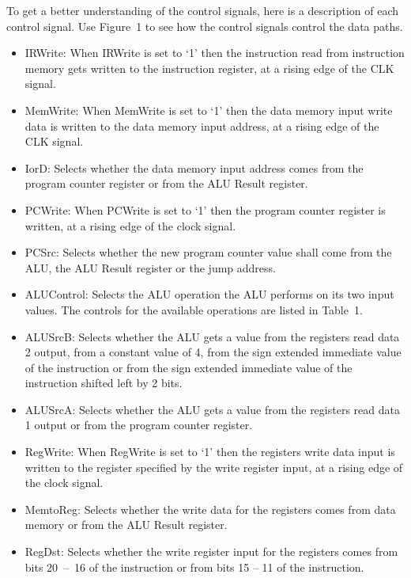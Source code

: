\documentclass[a4paper,12pt]{article}
\begin{document}
To get a better understanding of the control signals, here is a description of each control
signal. Use Figure~1 to see how the control signals control the data paths.

\begin{itemize}

\item{IRWrite: When IRWrite is set to `1' then the instruction read from instruction memory gets written to the instruction register, at a rising edge of the CLK signal.}

\item{MemWrite: When MemWrite is set to `1' then the data memory input write data is written to the data memory input address, at a rising edge of the CLK signal.}

\item{IorD: Selects whether the data memory input address comes from the program counter register or from the ALU Result register.}

\item{PCWrite: When PCWrite is set to `1' then the program counter register is written, at a rising edge of the clock signal.}

\item{PCSrc: Selects whether the new program counter value shall come from the ALU, the ALU Result register or the jump address.}

\item{ALUControl: Selects the ALU operation the ALU performs on its two input values. The controls for the available operations are listed in Table~1.}

\item{ALUSrcB: Selects whether the ALU gets a value from the registers read data 2 output, from a constant value of 4, from the sign extended immediate value of the instruction or from the sign extended immediate value of the instruction shifted left by 2 bits.}

\item{ALUSrcA: Selects whether the ALU gets a value from the registers read data 1 output or from the program counter register.}

\item{RegWrite: When RegWrite is set to `1' then the registers write data input is written to the register specified by the write register input, at a rising edge of the clock signal.}

\item{MemtoReg: Selects whether the write data for the registers comes from data memory or from the ALU Result register.}

\item{RegDst: Selects whether the write register input for the registers comes from bits 20~--~16 of the instruction or from bits 15 -- 11 of the instruction.}

\end{itemize}
\end{document}
